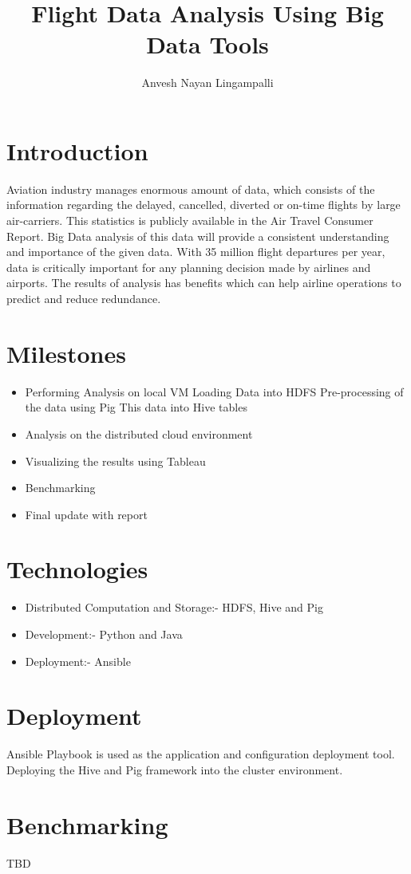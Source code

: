 \documentclass[9pt,twocolumn,twoside]{../../styles/osajnl}
\title{Flight Data Analysis Using Big Data Tools}
\author[1,*]{Anvesh Nayan Lingampalli}
\affil[1]{School of Informatics and Computing, Bloomington, IN 47408, U.S.A.}
\affil[*]{Corresponding authors:anveling@indiana.edu}
\begin{document}
\maketitle

\section{Introduction}

Aviation industry manages enormous amount of data, which consists of
the information regarding the delayed, cancelled, diverted or on-time
flights by large air-carriers\cite{aviationanalysis}. This statistics
is publicly available in the Air Travel Consumer Report. Big Data
analysis of this data will provide a consistent understanding and
importance of the given data. With 35 million flight departures per
year, data is critically important for any planning decision made by
airlines and airports. The results of analysis has benefits which can
help airline operations to predict and reduce
redundance\cite{bigdatainaviation}.

\section{Milestones}

\begin{itemize}
\item Performing Analysis on local VM
\subitem Loading Data into HDFS
\subitem Pre-processing of the data using Pig
\subitem This data into Hive tables
\item Analysis on the distributed cloud environment
\item Visualizing the results using Tableau
\item Benchmarking
\item Final update with report
\end{itemize}


\section{Technologies}

\begin{itemize}
\item Distributed Computation and Storage:- HDFS, Hive and Pig
\item Development:- Python and Java
\item Deployment:- Ansible
\end{itemize}

\section{Deployment}
Ansible Playbook is used as the application and configuration
deployment tool. Deploying the Hive and Pig framework into the
cluster environment. 

\section{Benchmarking}
TBD


\end{document}
